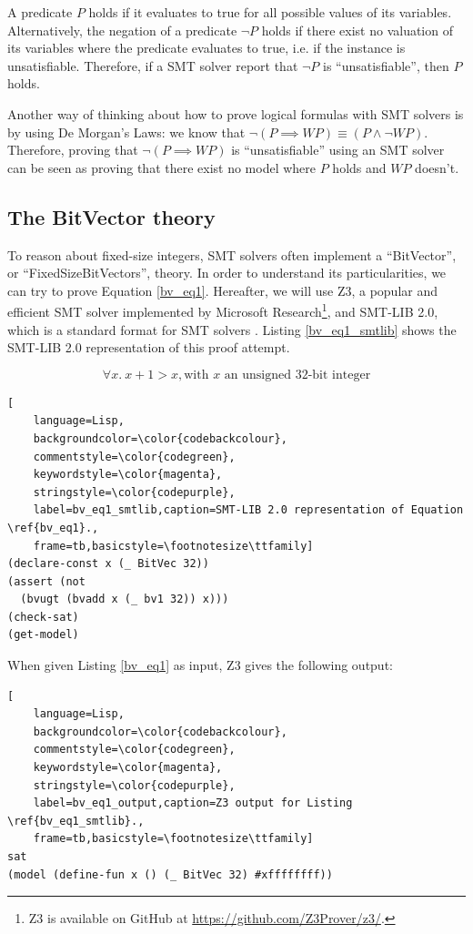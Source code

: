 \documentclass{kththesis}
\newcommand{\WP}{\ensuremath{\mathit{WP}}}
\begin{document}
{A predicate $P$ holds if it evaluates to true for all possible values of its variables. Alternatively, the negation of a predicate $\neg P$ holds if there exist no valuation of its variables where the predicate evaluates to true, i.e. if the instance is unsatisfiable. Therefore, if a \gls{SMT} solver report that $\neg P$ is ``unsatisfiable'', then $P$ holds.

Another way of thinking about how to prove logical formulas with \gls{SMT} solvers is by using De Morgan's Laws: we know that $\neg (P \implies \WP) \equiv (P \land \neg \WP)$. Therefore, proving that $\neg (P \implies \WP)$ is ``unsatisfiable'' using an \gls{SMT} solver can be seen as proving that there exist no model where $P$ holds and $\WP$ doesn't.

\subsection{The BitVector theory}

To reason about fixed-size integers, \gls{SMT} solvers often implement a ``BitVector'', or ``FixedSizeBitVectors'', theory. In order to understand its particularities, we can try to prove Equation \ref{bv_eq1}. Hereafter, we will use Z3, a popular and efficient \gls{SMT} solver implemented by Microsoft Research\footnote{Z3 is available on GitHub at \url{https://github.com/Z3Prover/z3/}.}, and SMT-LIB 2.0, which is a standard format for \gls{SMT} solvers \cite{barrett_satisfiability_2016}. Listing \ref{bv_eq1_smtlib} shows the SMT-LIB 2.0 representation of this proof attempt.

\begin{equation}
    \forall x.~ x + 1 > x, \text{with $x$ an unsigned 32-bit integer}
    \label{bv_eq1}
\end{equation}

\begin{lstlisting}[
    language=Lisp,
    backgroundcolor=\color{codebackcolour},
    commentstyle=\color{codegreen},
    keywordstyle=\color{magenta},
    stringstyle=\color{codepurple},
    label=bv_eq1_smtlib,caption=SMT-LIB 2.0 representation of Equation \ref{bv_eq1}.,
    frame=tb,basicstyle=\footnotesize\ttfamily]
(declare-const x (_ BitVec 32))
(assert (not
  (bvugt (bvadd x (_ bv1 32)) x)))
(check-sat)
(get-model)
\end{lstlisting}

When given Listing \ref{bv_eq1} as input, Z3 gives the following output:

\begin{lstlisting}[
    language=Lisp,
    backgroundcolor=\color{codebackcolour},
    commentstyle=\color{codegreen},
    keywordstyle=\color{magenta},
    stringstyle=\color{codepurple},
    label=bv_eq1_output,caption=Z3 output for Listing \ref{bv_eq1_smtlib}.,
    frame=tb,basicstyle=\footnotesize\ttfamily]
sat
(model (define-fun x () (_ BitVec 32) #xffffffff))
\end{lstlisting}

}
\end{document}
